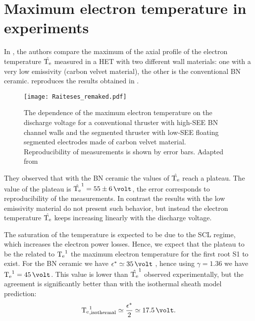 

    
    \section{Maximum electron temperature in experiments}
    
    
    In \citet{raitses2006}, the authors compare the maximum of the axial profile of the electron temperature $\hat{\mathrm{T_e}}$ measured in a \ac{HET} with two different wall materials\string: one with a very low emissivity (carbon velvet material), the other is the conventional \ac{BN} ceramic.
     reproduces the results obtained in \citet{raitses2006}.

    \begin{figure}[hbt]
      \centering
      \texttt{[image: Raiteses\_remaked.pdf]}
      \caption{ The dependence of the maximum electron temperature on the discharge  voltage for a conventional thruster with high-SEE \acs{BN} channel walls and the segmented thruster with low-SEE floating segmented electrodes made of carbon velvet material. Reproducibility of measurements is shown by error bars. Adapted from \citet[Fig. 3]{raitses2006} }
      \label{fig-raiteses2006}
    \end{figure}

    They observed that with the \ac{BN} ceramic the values of $\hat{\mathrm{T_e}}$ reach a plateau.
    The value of the plateau is $\hat{\Te}^1 = 55 \pm 6\,\volt$, the error corresponds to reproducibility of the measurements.
    In contrast the results with the low emissivity material do not present such behavior, but instead the electron temperature $\hat{\mathrm{T_e}}$ keeps increasing linearly with the discharge voltage.
    
    The saturation of the temperature is expected to be due to the \ac{SCL} regime, which increases the electron power losses.
    Hence, we expect that the plateau to be the related to $\mathrm{T_e}^1$ the maximum electron temperature for the first root S1 to exist.
    For the \ac{BN} ceramic we have $\crover \simeq 35\,\volt$ \citep{smirnov2004}, hence using $\gamma=1.36$ we have $\Te^1 = 45\,\volt$.
    This value is lower than $\hat{\mathrm{T_e}}^1$ observed experimentally, but the agreement is significantly better than with the isothermal sheath model prediction\string:
    \begin{equation} \label{eq-Temaxisothermal}
      \Te^1_{\rm , isothermal} \simeq \frac{\crover}{2} \simeq 17.5 \,\volt.
    \end{equation}
    
